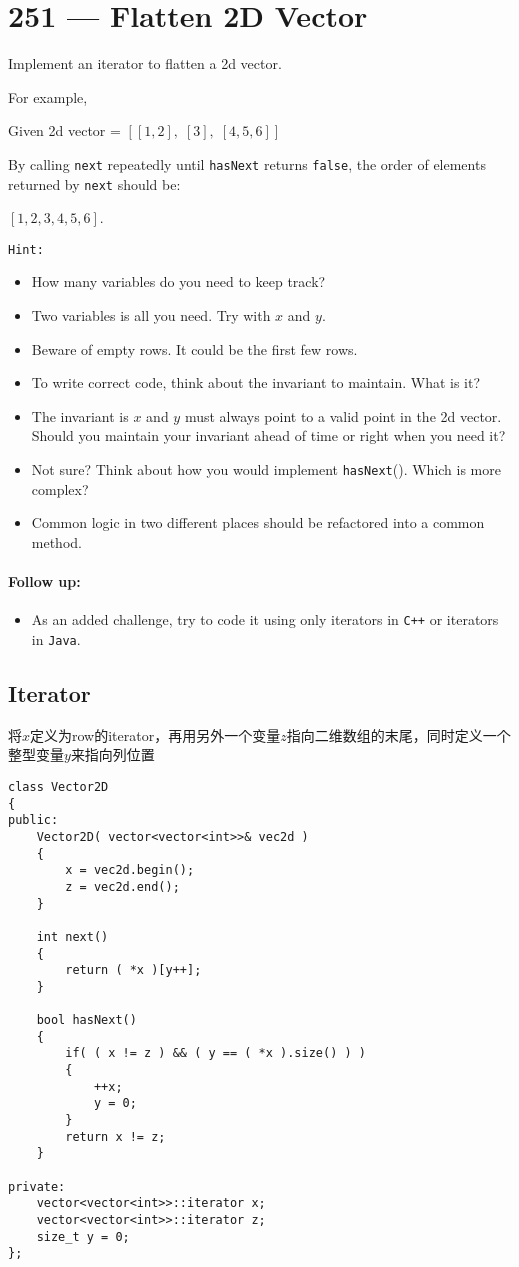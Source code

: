 \section{251 --- Flatten 2D Vector}
Implement an iterator to flatten a 2d vector.
\par
For example,
\par
Given 2d vector = $[[1,2],\;[3],\;[4,5,6]]$
\par
By calling \texttt{next} repeatedly until \texttt{hasNext} returns \texttt{false}, the order of elements returned by \texttt{next} should be: 
\par

$[1,2,3,4,5,6]$.
\par
\texttt{Hint:}

\begin{itemize}
\item How many variables do you need to keep track?
\item Two variables is all you need. Try with $x$ and $y$.
\item Beware of empty rows. It could be the first few rows.
\item To write correct code, think about the invariant to maintain. What is it?
\item The invariant is $x$ and $y$ must always point to a valid point in the 2d vector. Should you maintain your invariant ahead of time or right when you need it?
\item Not sure? Think about how you would implement \texttt{hasNext}(). Which is more complex?
\item Common logic in two different places should be refactored into a common method.
\end{itemize}

\paragraph{Follow up:}
\begin{itemize}
\item As an added challenge, try to code it using only iterators in \texttt{C++} or iterators in \texttt{Java}.
\end{itemize}
\subsection{Iterator}
将$x$定义为row的iterator，再用另外一个变量$z$指向二维数组的末尾，同时定义一个整型变量$y$来指向列位置
\setcounter{lstlisting}{0}
\begin{lstlisting}[style=customc, caption={Iterator}]
class Vector2D
{
public:
    Vector2D( vector<vector<int>>& vec2d )
    {
        x = vec2d.begin();
        z = vec2d.end();
    }
	
    int next()
    {
        return ( *x )[y++];
    }
	
    bool hasNext()
    {
        if( ( x != z ) && ( y == ( *x ).size() ) )
        {
            ++x;
            y = 0;
        }
        return x != z;
    }

private:
    vector<vector<int>>::iterator x;
    vector<vector<int>>::iterator z;
    size_t y = 0;
};
\end{lstlisting}